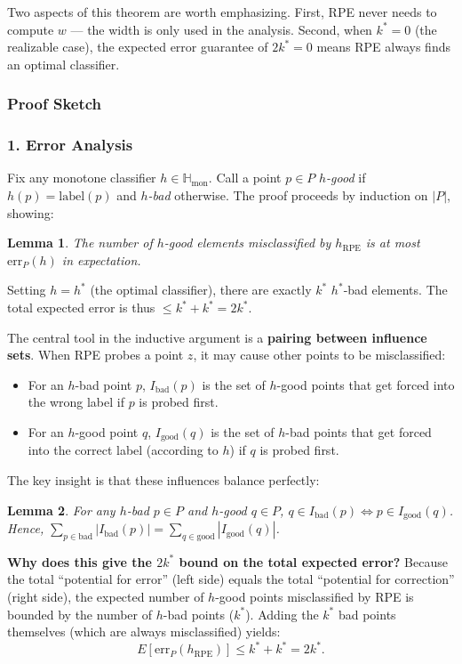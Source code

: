 \documentclass[11pt, a4paper]{article}
\theoremstyle{boxed}
\newtheorem{innerlemma}{Lemma}[section]
\newenvironment{lemma}
  {\begin{mdframed}[style=lemstyle]\begin{innerlemma}}
  {\end{innerlemma}\end{mdframed}}
\begin{document}
Two aspects of this theorem are worth emphasizing. First, RPE never needs to compute $w$ --- the width is only used in the analysis. Second, when $k^* = 0$ (the realizable case), the expected error guarantee of $2k^* = 0$ means RPE always finds an optimal classifier.

\subsubsection*{Proof Sketch}

\subsubsection*{1. Error Analysis} 
Fix any monotone classifier $h \in \mathbb{H}_{\text{mon}}$. Call a point $p \in P$ \emph{$h$-good} if $h(p) = \text{label}(p)$ and \emph{$h$-bad} otherwise. The proof proceeds by induction on $|P|$, showing:
\begin{lemma}
  \item The number of \emph{$h$-good} elements misclassified by $h_{\text{RPE}}$ is at most $\text{err}_P(h)$ in expectation.
\end{lemma}
Setting $h = h^*$ (the optimal classifier), there are exactly $k^*$ $h^*$-bad elements. The total expected error is thus $\le k^* + k^* = 2k^*$.

\medskip
The central tool in the inductive argument is a \textbf{pairing between influence sets}. When RPE probes a point $z$, it may cause other points to be misclassified:
\begin{itemize}
    \item For an $h$-bad point $p$, $I_{\text{bad}}(p)$ is the set of $h$-good points that get forced into the wrong label if $p$ is probed first.
    \item For an $h$-good point $q$, $I_{\text{good}}(q)$ is the set of $h$-bad points that get forced into the correct label (according to $h$) if $q$ is probed first.
\end{itemize}

The key insight is that these influences balance perfectly:
\begin{lemma}
For any $h$-bad $p \in P$ and $h$-good $q \in P$,
$q \in I_{\text{bad}}(p) \iff p \in I_{\text{good}}(q)$.
Hence, $\sum_{p \in \text{bad}} |I_{\text{bad}}(p)| = \sum_{q \in \text{good}} |I_{\text{good}}(q)|$.
\end{lemma}

\textbf{Why does this give the $2k^*$ bound on the total expected error?} Because the total ``potential for error'' (left side) equals the total ``potential for correction'' (right side), the expected number of $h$-good points misclassified by RPE is bounded by the number of $h$-bad points ($k^*$). Adding the $k^*$ bad points themselves (which are always misclassified) yields:
\[
E[\text{err}_P(h_{\text{RPE}})] \le k^* + k^* = 2k^*.
\]
\end{document}
